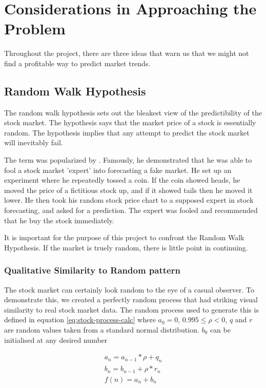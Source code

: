 \documentclass{report}
\begin{document}
\chapter{Considerations in Approaching the Problem}

Throughout the project, there are three ideas that warn us that we might not find a profitable way to predict market trends.

\section{Random Walk Hypothesis}

The random walk hypothesis sets out the bleakest view of the predictibility of the stock market. The hypothesis says that the market price of a stock is essentially random. The hypothesis implies that any attempt to predict the stock market will inevitably fail. 

The term was popularized by \citet{malkiel1999random}. Famously, he demonstrated that he was able to fool a stock market 'expert' into forecasting a fake market. He set up an experiment where he repeatedly tossed a coin. If the coin showed heads, he moved the price of a fictitious stock up, and if it showed tails then he moved it lower. He then took his random stock price chart to a supposed expert in stock forecasting, and asked for a prediction. The expert was fooled and recommended that he buy the stock immediately. 

It is important for the purpose of this project to confront the Random Walk Hypothesis. If the market is truely random, there is little point in continuing. 

\subsection{Qualitative Similarity to Random pattern}

The stock market can certainly look random to the eye of a casual observer. To demonstrate this, we created a perfectly random process that had striking visual similarity to real stock market data. The random process used to generate this is defined in equation \ref{eq:stock-process-calc} where $a_{0} = 0$, $0.995 \leq \rho < 0$, $q$ and $r$ are random values taken from a standard normal distribution. $b_{0}$ can be initialised at any desired number

\begin{equation}
  \label{eq:stock-process-calc}
  \begin{aligned}
  	a_{n} = a_{n-1} * \rho + q_{n}\\
  	b_{n} = b_{n-1} + \rho * r_{n}\\
  	f(n) = a_{n} + b_{n}\\   
  \end{aligned}
\end{equation}
\end{document}
